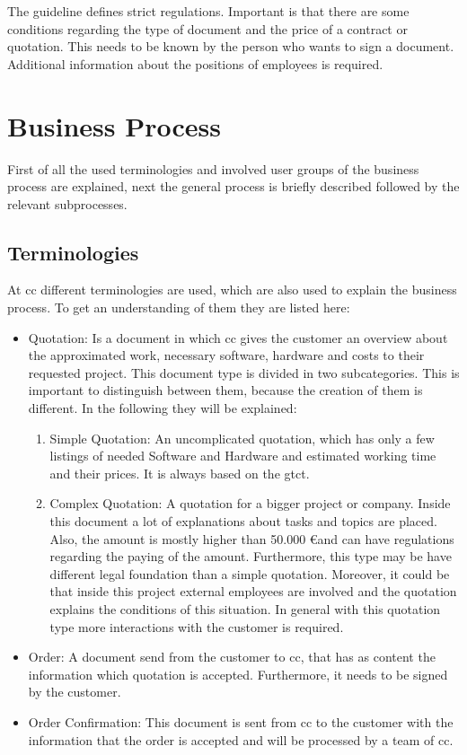 The guideline defines strict regulations. Important is that there are some conditions regarding the type of document and the price of a contract or quotation. This needs to be known by the person who wants to sign a document. Additional information about the positions of employees is required.

\section{Business Process} \label{sec:bp}
First of all the used terminologies and involved user groups of the business process are explained, next the general process is briefly described followed by the relevant subprocesses.

\subsection*{Terminologies}
At \gls{cc} different terminologies are used, which are also used to explain the business process. To get an understanding of them they are listed here:
\begin{itemize}
	\item Quotation: \newline
	Is a document in which \gls{cc} gives the customer an overview about the approximated work, necessary software, hardware and costs to their requested project. This document type is divided in two subcategories. This is important to distinguish between them, because the creation of them is different. In the following they will be explained:
	\begin{enumerate}
		\item Simple Quotation: \newline
		An uncomplicated quotation, which has only a few listings of needed Software and Hardware and estimated working time and their prices. It is always based on the \gls{gtct}.
		\item Complex Quotation: \newline
		A quotation for a bigger project or company. Inside this document a lot of explanations about tasks and topics are placed. Also, the amount is mostly higher than 50.000 \euro and can have regulations regarding the paying of the amount. Furthermore, this type may be have different legal foundation than a simple quotation. Moreover, it could be that inside this project external employees are involved and the quotation explains the conditions of this situation. In general with this quotation type more interactions with the customer is required. 
	\end{enumerate}
	\item Order: \newline
	A document send from the customer to \gls{cc}, that has as content the information which quotation is accepted. Furthermore, it needs to be signed by the customer.
	\item Order Confirmation: \newline
	This document is sent from \gls{cc} to the customer with the information that the order is accepted and will be processed by a team of \gls{cc}.
\end{itemize}
\newpage
